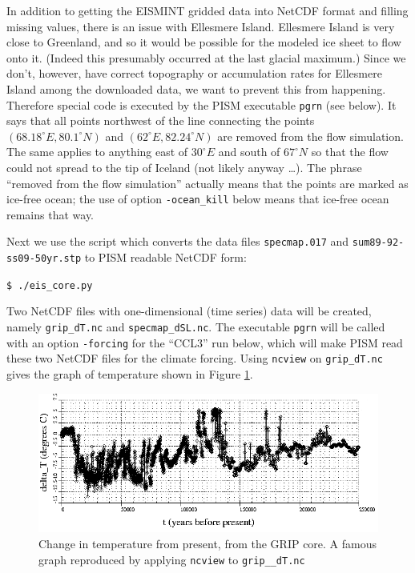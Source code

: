 \documentclass[11pt,final]{amsart}
\newcommand{\und}{\_\!\_}
\begin{document}
In addition to getting the EISMINT gridded data into NetCDF format and filling missing values, there is an issue with Ellesmere Island.  Ellesmere Island is very close to Greenland, and so it would be possible for the modeled ice sheet to flow onto it.  (Indeed this presumably occurred at the last glacial maximum.)  Since we don't, however, have correct topography or accumulation rates for Ellesmere Island among the downloaded data, we want to prevent this from happening.  Therefore special code is executed by the PISM executable \verb|pgrn| (see below).  It says that all points northwest of the line connecting the points $(68.18^\circ E, 80.1^\circ N)$ and $(62^\circ E, 82.24^\circ N)$ are removed from the flow simulation.  The same applies to anything east of $30^\circ E$ and south of $67^\circ N$ so that the flow could not spread to the tip of Iceland (not likely anyway \dots).  The phrase ``removed from the flow simulation'' actually means that the points are marked as ice-free ocean; the use of option \verb|-ocean_kill| below means that ice-free ocean remains that way.

Next we use the script which converts the data files \verb|specmap.017| and \verb|sum89-92-ss09-50yr.stp| to  PISM readable NetCDF form:

\verb|$ ./eis_core.py|

\noindent Two NetCDF files with one-dimensional (time series) data will be created, namely \verb|grip_dT.nc| and \verb|specmap_dSL.nc|.  The executable \verb|pgrn| will be called with an option \verb|-forcing| for the ``CCL3'' run below, which will make PISM read these two NetCDF files for the climate forcing.  Using \verb|ncview| on \verb|grip_dT.nc| gives the graph of temperature shown in Figure \ref{fig:gripDeltaT}.

\begin{figure}[ht]
\includegraphics[width=5.6in,keepaspectratio=true]{figs/gripDeltaT}
\caption{Change in temperature from present, from the GRIP core.  A famous graph reproduced by applying \texttt{ncview} to \texttt{grip\und dT.nc}}
\label{fig:gripDeltaT}
\end{figure}
\end{document}

